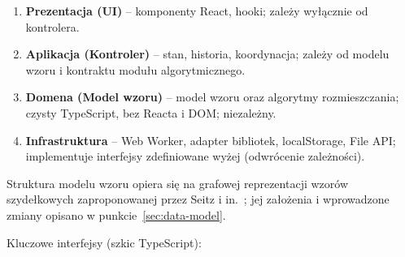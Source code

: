 \documentclass[a4paper,11pt]{article}
\begin{document}
\begin{enumerate}
  \item \textbf{Prezentacja (UI)} -- komponenty React, hooki; zależy wyłącznie od kontrolera.
  \item \textbf{Aplikacja (Kontroler)} -- stan, historia, koordynacja; zależy od modelu wzoru i kontraktu modułu algorytmicznego.
  \item \textbf{Domena (Model wzoru)} -- model wzoru oraz algorytmy rozmieszczania; czysty TypeScript, bez Reacta i DOM; niezależny.
  \item \textbf{Infrastruktura} -- Web Worker, adapter bibliotek, localStorage, File API; implementuje interfejsy zdefiniowane wyżej (odwrócenie zależności).
\end{enumerate}

Struktura modelu wzoru opiera się na grafowej reprezentacji wzorów szydełkowych zaproponowanej przez Seitz i in.~\cite{seitz2022digital, seitz2021language}; jej założenia i wprowadzone zmiany opisano w punkcie~\ref{sec:data-model}.

Kluczowe interfejsy (szkic TypeScript):
\end{document}

